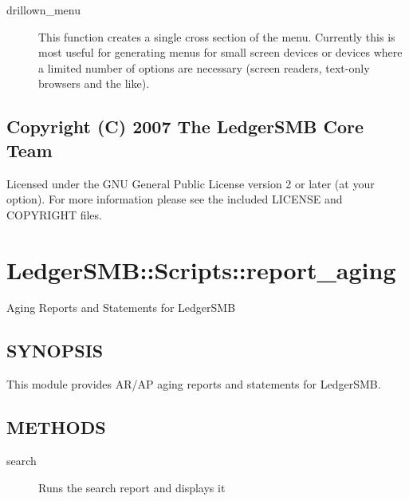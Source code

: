 \begin{description}
\begin{description}
\end{description}
\begin{description}

\item[{drillown\_menu}] \mbox{}

This function creates a single cross section of the menu.  Currently this is
most useful for generating menus for small screen devices or devices where a
limited number of options are necessary (screen readers, text-only browsers and
the like).

\end{description}
\subsection*{Copyright (C) 2007 The LedgerSMB Core Team\label{LedgerSMB::Scripts::menu_Copyright_C_2007_The_LedgerSMB_Core_Team}}


Licensed under the GNU General Public License version 2 or later (at your 
option).  For more information please see the included LICENSE and COPYRIGHT 
files.

\section{LedgerSMB::Scripts::report\_aging\label{LedgerSMB::Scripts::report_aging}}


Aging Reports and Statements for LedgerSMB

\subsection*{SYNOPSIS\label{LedgerSMB::Scripts::report_aging_SYNOPSIS}}


This module provides AR/AP aging reports and statements for LedgerSMB.

\subsection*{METHODS\label{LedgerSMB::Scripts::report_aging_METHODS}}
\begin{description}

\item[{search}] \mbox{}

Runs the search report and displays it



\end{description}
\end{description}

